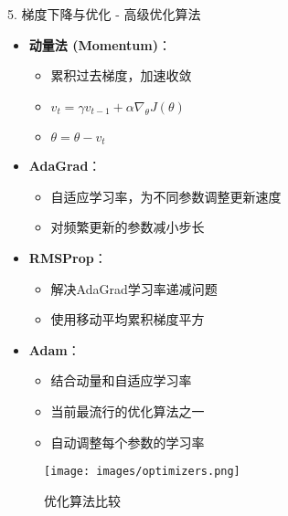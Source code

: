 \documentclass[
  ignorenonframetext,
  aspectratio=169,
  chinese-hans,
]{beamer}
\providecommand{\tightlist}{%
  \setlength{\itemsep}{0pt}\setlength{\parskip}{0pt}}\usepackage{longtable,booktabs,array}
\begin{document}
\begin{frame}{5. 梯度下降与优化 - 高级优化算法}
\label{ux68afux5ea6ux4e0bux964dux4e0eux4f18ux5316---ux9ad8ux7ea7ux4f18ux5316ux7b97ux6cd5}
\begin{itemize}
\tightlist
\item
  \textbf{动量法 (Momentum)}：

  \begin{itemize}
  \tightlist
  \item
    累积过去梯度，加速收敛
  \item
    \(v_t = \gamma v_{t-1} + \alpha \nabla_{\theta}J(\theta)\)
  \item
    \(\theta = \theta - v_t\)
  \end{itemize}
\item
  \textbf{AdaGrad}：

  \begin{itemize}
  \tightlist
  \item
    自适应学习率，为不同参数调整更新速度
  \item
    对频繁更新的参数减小步长
  \end{itemize}
\item
  \textbf{RMSProp}：

  \begin{itemize}
  \tightlist
  \item
    解决AdaGrad学习率递减问题
  \item
    使用移动平均累积梯度平方
  \end{itemize}
\item
  \textbf{Adam}：

  \begin{itemize}
  \tightlist
  \item
    结合动量和自适应学习率
  \item
    当前最流行的优化算法之一
  \item
    自动调整每个参数的学习率
  \end{itemize}
\end{itemize}

\begin{figure}[H]

{\centering \texttt{[image: images/optimizers.png]}

}

\caption{优化算法比较}

\end{figure}%
\end{frame}
\end{document}
